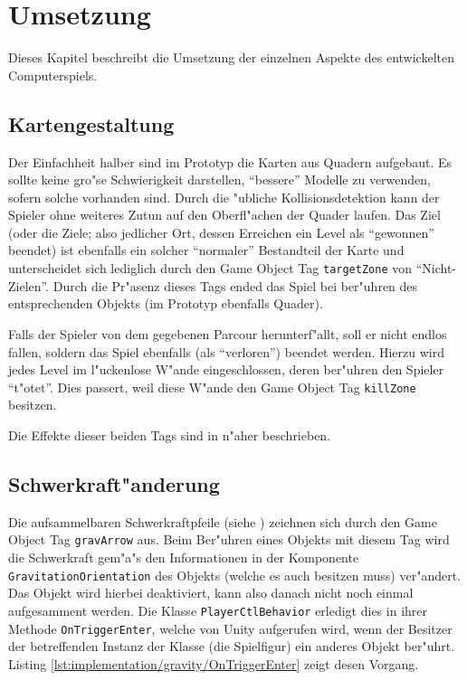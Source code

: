 \section{Umsetzung}
\label{sec:implementation}
%
Dieses Kapitel beschreibt die Umsetzung der einzelnen Aspekte des
entwickelten Computerspiels.
%
\subsection{Kartengestaltung}
\label{sec:implementation/maps}
%
Der Einfachheit halber sind im Prototyp die Karten aus Quadern aufgebaut.
Es sollte keine gro"se Schwierigkeit darstellen, ``bessere'' Modelle
zu verwenden, sofern solche vorhanden sind. Durch die "ubliche Kollisionsdetektion
kann der Spieler ohne weiteres Zutun auf den Oberfl"achen der Quader laufen.
Das Ziel (oder die Ziele; also jedlicher Ort, dessen Erreichen ein Level als
``gewonnen'' beendet) ist ebenfalls ein solcher ``normaler'' Bestandteil der Karte
und unterscheidet sich lediglich durch den Game Object Tag \texttt{targetZone}
von ``Nicht-Zielen''. Durch die Pr"asenz dieses Tags ended das Spiel bei
ber"uhren des entsprechenden Objekts (im Prototyp ebenfalls Quader).

Falls der Spieler von dem gegebenen Parcour herunterf"allt, soll er nicht
endlos fallen, soldern das Spiel ebenfalls (als ``verloren'') beendet
werden. Hierzu wird jedes Level im l"uckenlose W"ande eingeschlossen,
deren ber"uhren den Spieler ``t"otet''. Dies passert, weil diese W"ande
den Game Object Tag \texttt{killZone} besitzen.

Die Effekte dieser beiden Tags sind in 
n"aher beschrieben.
%
\subsection{Schwerkraft"anderung}
\label{sec:implementation/gravity}
%
Die aufsammelbaren Schwerkraftpfeile (siehe )
zeichnen sich durch den Game Object Tag \texttt{gravArrow} aus. Beim Ber"uhren
eines Objekts mit diesem Tag wird die Schwerkraft gem"a"s den Informationen in
der Komponente \texttt{GravitationOrientation} des Objekts (welche es auch
besitzen muss) ver"andert. Das Objekt wird hierbei deaktiviert, kann also danach
nicht noch einmal aufgesamment werden. Die Klasse \texttt{PlayerCtlBehavior}
erledigt dies in ihrer Methode \texttt{OnTriggerEnter}, welche von Unity
aufgerufen wird, wenn der Besitzer der betreffenden Instanz der Klasse (die
Spielfigur) ein anderes Objekt ber"uhrt. Listing
\ref{lst:implementation/gravity/OnTriggerEnter} zeigt desen Vorgang.

